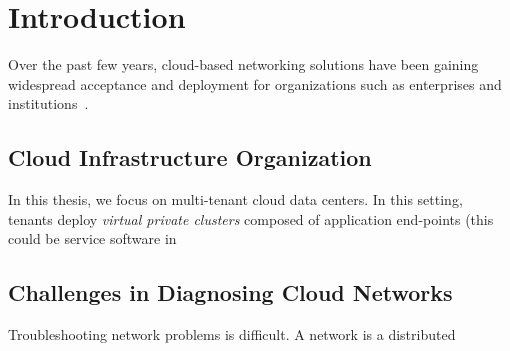 \chapter{Introduction}
\label{chap:intro}
Over the past few years, cloud-based networking solutions have been gaining widespread acceptance and
deployment for organizations such as enterprises and institutions~\cite{paxson1997end}.

\section{Cloud Infrastructure Organization}

In this thesis, we focus on multi-tenant cloud data centers.
In this setting, tenants deploy \emph{virtual private clusters}
composed of application end-points (this could be service software in

\section{Challenges in Diagnosing Cloud Networks}
\label{sec:intro:challenges}
Troubleshooting network problems is difficult. A network is a distributed

